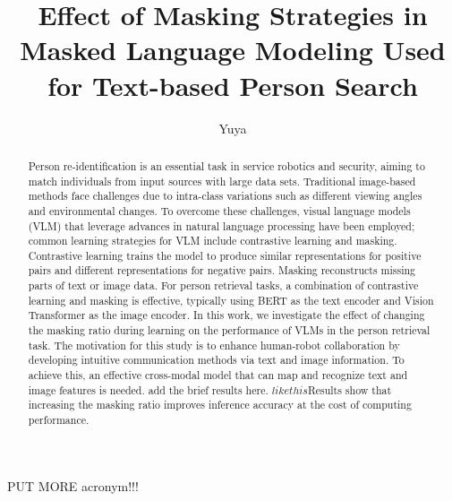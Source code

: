 \documentclass[mscthesis,english,oneside,biblatex,imlex]{template/uefcsthesis}
\title{Effect of Masking Strategies in Masked Language Modeling Used for Text-based Person Search} %
\author{Yuya}{Takagi} %
\date{\thismonth} %
\begin{document}
{\color{red} PUT MORE acronym!!!}

\maketitle

\begin{abstract}
Person re-identification is an essential task in service robotics and security, aiming to match individuals from input sources with large data sets. Traditional image-based methods face challenges due to intra-class variations such as different viewing angles and environmental changes. To overcome these challenges, visual language models (VLM) that leverage advances in natural language processing have been employed; common learning strategies for VLM include contrastive learning and masking. Contrastive learning trains the model to produce similar representations for positive pairs and different representations for negative pairs. Masking reconstructs missing parts of text or image data.
For person retrieval tasks, a combination of contrastive learning and masking is effective, typically using BERT as the text encoder and Vision Transformer as the image encoder. In this work, we investigate the effect of changing the masking ratio during learning on the performance of VLMs in the person retrieval task. The motivation for this study is to enhance human-robot collaboration by developing intuitive communication methods via text and image information. To achieve this, an effective cross-modal model that can map and recognize text and image features is needed. {\color{red} add the brief results here. \(like this\)Results show that increasing the masking ratio improves inference accuracy at the cost of computing performance.}
\end{abstract}

\frontmatter
\tableofcontents
\mainmatter
\printglossary[type=\acronymtype]


% 


% 



\appendix
% 



\printbibliography[heading=bibintoc]

\backmatter %
\end{document}
